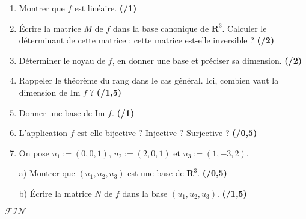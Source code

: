 \documentclass[french]{article}
\begin{document}
\begin{enumerate}
	\item Montrer que $f$ est linéaire. \textbf{(/1)}
	
	\vspace{0.5\baselineskip}
	
	\item Écrire la matrice $M$ de $f$ dans la base canonique de $\mathbf{R}^3$. Calculer le déterminant de cette matrice ; cette matrice est-elle inversible ? \textbf{(/2)}
	
	\vspace{0.5\baselineskip}
	
	\item Déterminer le noyau de $f$, en donner une base et préciser sa dimension. \textbf{(/2)}
	
	\vspace{0.5\baselineskip}
	
	\item Rappeler le théorème du rang dans le cas général. Ici, combien vaut la dimension de Im $f$ ? \textbf{(/1,5)}
	
	\vspace{0.5\baselineskip}
	
	\item Donner une base de Im $f$. \textbf{(/1)}
	
	\vspace{0.5\baselineskip}
	
	\item L'application $f$ est-elle bijective ? Injective ? Surjective ? \textbf{(/0,5)}
	
	\vspace{0.5\baselineskip}
	
	\item On pose $u_1 := (0,0,1)$, $u_2 := (2,0,1)$ et $u_3 := (1,-3,2)$.
	
	\vspace{0.25\baselineskip}
	
		\subitem a) Montrer que $(u_1,u_2,u_3)$ est une base de $\mathbf{R}^3$. \textbf{(/0,5)}
		
		\subitem b) Écrire la matrice $N$ de $f$ dans la base $(u_1,u_2,u_3)$. \textbf{(/1,5)}
		
\end{enumerate}

\vspace{2\baselineskip}

\begin{center}
	\huge $\mathcal{FIN}$
\end{center}
\end{document}
